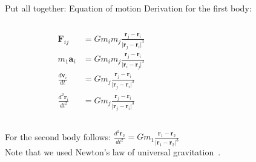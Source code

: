 \documentclass[12pt,t]{beamer}
\begin{document}
\begin{frame}{Put all together: Equation of motion}
Derivation for the first body:
\begin{columns}
\begin{column}{0.5\textwidth}
\begin{align*}
\mathbf{F}_{ij}&=G m_i m_j \frac{\mathbf{r}_j-\mathbf{r}_i}{\vert \mathbf{r}_j-\mathbf{r}_i \vert^3}  \\
m_1 \mathbf{a}_i &= G m_i m_j \frac{\mathbf{r}_j-\mathbf{r}_i}{\vert \mathbf{r}_i-\mathbf{r}_j \vert^3} \\
\frac{d \mathbf{v}_i}{dt} & = G m_j \frac{\mathbf{r}_j-\mathbf{r}_i}{\vert \mathbf{r}_j-\mathbf{r}_i \vert^3} \\
\frac{d^2 \mathbf{r}_i}{dt^2} & = G m_j \frac{\mathbf{r}_j-\mathbf{r}_i}{\vert \mathbf{r}_j-\mathbf{r}_i \vert^3}
\end{align*}
\end{column}
\begin{column}{0.5\textwidth}  %
    \begin{center}
     \end{center}
\end{column}
\end{columns} 
\vspace{0.5cm}
For the second body follows:
$\frac{d^2 \mathbf{r}_2}{dt^2}  = G m_1 \frac{\mathbf{r}_1-\mathbf{r}_2}{\vert \mathbf{r}_1-\mathbf{r}_2 \vert^3}$ \\
\vspace{0.5cm}
Note that we used Newton's law of universal gravitation~\cite{newton1833philosophiae}.

\end{frame}
\end{document}

